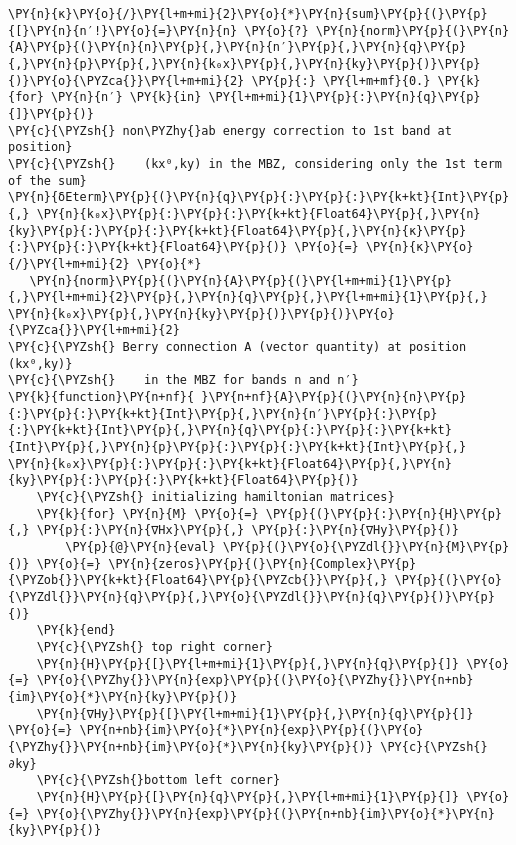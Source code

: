 \begin{Verbatim}[commandchars=\\\{\}]
   \PY{n}{κ}\PY{o}{/}\PY{l+m+mi}{2}\PY{o}{*}\PY{n}{sum}\PY{p}{(}\PY{p}{[}\PY{n}{n′!}\PY{o}{=}\PY{n}{n} \PY{o}{?} \PY{n}{norm}\PY{p}{(}\PY{n}{A}\PY{p}{(}\PY{n}{n}\PY{p}{,}\PY{n}{n′}\PY{p}{,}\PY{n}{q}\PY{p}{,}\PY{n}{p}\PY{p}{,}\PY{n}{k₀x}\PY{p}{,}\PY{n}{ky}\PY{p}{)}\PY{p}{)}\PY{o}{\PYZca{}}\PY{l+m+mi}{2} \PY{p}{:} \PY{l+m+mf}{0.} \PY{k}{for} \PY{n}{n′} \PY{k}{in} \PY{l+m+mi}{1}\PY{p}{:}\PY{n}{q}\PY{p}{]}\PY{p}{)}
\PY{c}{\PYZsh{} non\PYZhy{}ab energy correction to 1st band at position}
\PY{c}{\PYZsh{}    (kx⁰,ky) in the MBZ, considering only the 1st term of the sum}
\PY{n}{δEterm}\PY{p}{(}\PY{n}{q}\PY{p}{:}\PY{p}{:}\PY{k+kt}{Int}\PY{p}{,} \PY{n}{k₀x}\PY{p}{:}\PY{p}{:}\PY{k+kt}{Float64}\PY{p}{,}\PY{n}{ky}\PY{p}{:}\PY{p}{:}\PY{k+kt}{Float64}\PY{p}{,}\PY{n}{κ}\PY{p}{:}\PY{p}{:}\PY{k+kt}{Float64}\PY{p}{)} \PY{o}{=} \PY{n}{κ}\PY{o}{/}\PY{l+m+mi}{2} \PY{o}{*}
   \PY{n}{norm}\PY{p}{(}\PY{n}{A}\PY{p}{(}\PY{l+m+mi}{1}\PY{p}{,}\PY{l+m+mi}{2}\PY{p}{,}\PY{n}{q}\PY{p}{,}\PY{l+m+mi}{1}\PY{p}{,} \PY{n}{k₀x}\PY{p}{,}\PY{n}{ky}\PY{p}{)}\PY{p}{)}\PY{o}{\PYZca{}}\PY{l+m+mi}{2}
\PY{c}{\PYZsh{} Berry connection A (vector quantity) at position (kx⁰,ky)}
\PY{c}{\PYZsh{}    in the MBZ for bands n and n′}
\PY{k}{function}\PY{n+nf}{ }\PY{n+nf}{A}\PY{p}{(}\PY{n}{n}\PY{p}{:}\PY{p}{:}\PY{k+kt}{Int}\PY{p}{,}\PY{n}{n′}\PY{p}{:}\PY{p}{:}\PY{k+kt}{Int}\PY{p}{,}\PY{n}{q}\PY{p}{:}\PY{p}{:}\PY{k+kt}{Int}\PY{p}{,}\PY{n}{p}\PY{p}{:}\PY{p}{:}\PY{k+kt}{Int}\PY{p}{,} \PY{n}{k₀x}\PY{p}{:}\PY{p}{:}\PY{k+kt}{Float64}\PY{p}{,}\PY{n}{ky}\PY{p}{:}\PY{p}{:}\PY{k+kt}{Float64}\PY{p}{)}
    \PY{c}{\PYZsh{} initializing hamiltonian matrices}
    \PY{k}{for} \PY{n}{M} \PY{o}{=} \PY{p}{(}\PY{p}{:}\PY{n}{H}\PY{p}{,} \PY{p}{:}\PY{n}{∇Hx}\PY{p}{,} \PY{p}{:}\PY{n}{∇Hy}\PY{p}{)}
        \PY{p}{@}\PY{n}{eval} \PY{p}{(}\PY{o}{\PYZdl{}}\PY{n}{M}\PY{p}{)} \PY{o}{=} \PY{n}{zeros}\PY{p}{(}\PY{n}{Complex}\PY{p}{\PYZob{}}\PY{k+kt}{Float64}\PY{p}{\PYZcb{}}\PY{p}{,} \PY{p}{(}\PY{o}{\PYZdl{}}\PY{n}{q}\PY{p}{,}\PY{o}{\PYZdl{}}\PY{n}{q}\PY{p}{)}\PY{p}{)}
    \PY{k}{end}
    \PY{c}{\PYZsh{} top right corner}
    \PY{n}{H}\PY{p}{[}\PY{l+m+mi}{1}\PY{p}{,}\PY{n}{q}\PY{p}{]} \PY{o}{=} \PY{o}{\PYZhy{}}\PY{n}{exp}\PY{p}{(}\PY{o}{\PYZhy{}}\PY{n+nb}{im}\PY{o}{*}\PY{n}{ky}\PY{p}{)}
    \PY{n}{∇Hy}\PY{p}{[}\PY{l+m+mi}{1}\PY{p}{,}\PY{n}{q}\PY{p}{]} \PY{o}{=} \PY{n+nb}{im}\PY{o}{*}\PY{n}{exp}\PY{p}{(}\PY{o}{\PYZhy{}}\PY{n+nb}{im}\PY{o}{*}\PY{n}{ky}\PY{p}{)} \PY{c}{\PYZsh{} ∂ky}
    \PY{c}{\PYZsh{}bottom left corner}
    \PY{n}{H}\PY{p}{[}\PY{n}{q}\PY{p}{,}\PY{l+m+mi}{1}\PY{p}{]} \PY{o}{=} \PY{o}{\PYZhy{}}\PY{n}{exp}\PY{p}{(}\PY{n+nb}{im}\PY{o}{*}\PY{n}{ky}\PY{p}{)}

\end{Verbatim}
